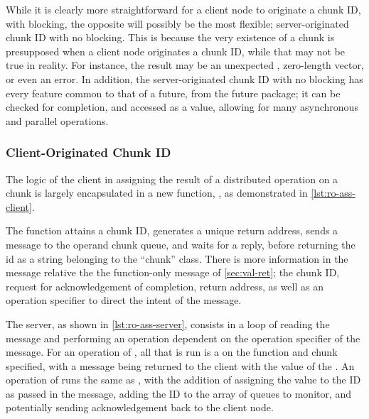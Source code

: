 
While it is clearly more straightforward for a client node to originate a chunk ID, with blocking, the opposite will possibly be the most flexible; server-originated chunk ID with no blocking.
This is because the very existence of a chunk is presupposed when a client node originates a chunk ID, while that may not be true in reality.
For instance, the result may be an unexpected , zero-length vector, or even an error.
In addition, the server-originated chunk ID with no blocking has every feature common to that of a future, from the future package; it can be checked for completion, and accessed as a value, allowing for many asynchronous and parallel operations.

\subsubsection{Client-Originated Chunk ID}

The logic of the client in assigning the result of a distributed operation on a chunk is largely encapsulated in a new function, , as demonstrated in \cref{lst:ro-ass-client}.


The function attains a chunk ID, generates a unique return address, sends a message to the operand chunk queue, and waits for a reply, before returning the id as a string belonging to the ``chunk'' class.
There is more information in the message relative the the function-only message of \cref{sec:val-ret}; the chunk ID, request for acknowledgement of completion, return address, as well as an operation specifier to direct the intent of the message.

The server, as shown in \cref{lst:ro-ass-server}, consists in a loop of reading the message and performing an operation dependent on the operation specifier of the message.
For an operation of , all that is run is a  on the function and chunk specified, with a message being returned to the client with the value of the .
An operation of  runs the same as , with the addition of assigning the value to the ID as passed in the message, adding the ID to the array of queues to monitor, and potentially sending acknowledgement back to the client node.

